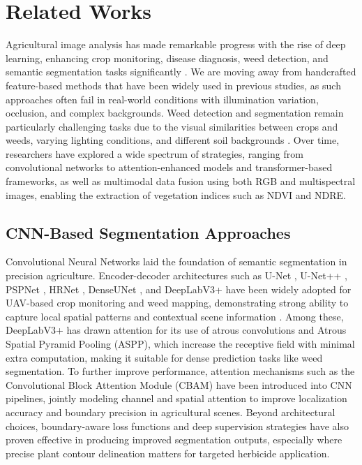 \documentclass[pdflatex,sn-mathphys-num]{sn-jnl}
\begin{document}
\section{Related Works}
Agricultural image analysis has made remarkable progress with the rise of deep learning, enhancing crop monitoring, disease diagnosis, weed detection, and semantic segmentation tasks significantly \cite{lei2024segmentationreview}. We are moving away from handcrafted feature-based methods that have been widely used in previous studies, as such approaches often fail in real-world conditions with illumination variation, occlusion, and complex backgrounds. Weed detection and segmentation remain particularly challenging tasks due to the visual similarities between crops and weeds, varying lighting conditions, and different soil backgrounds \cite{zhao2025deep,saini2025review}. Over time, researchers have explored a wide spectrum of strategies, ranging from convolutional networks to attention-enhanced models and transformer-based frameworks, as well as multimodal data fusion using both RGB and multispectral images, enabling the extraction of vegetation indices such as NDVI and NDRE.

\subsection{CNN-Based Segmentation Approaches}
Convolutional Neural Networks laid the foundation of semantic segmentation in precision agriculture. Encoder-decoder architectures such as U-Net \cite{ronneberger2015unet}, U-Net++ \cite{zhou2018unet++}, PSPNet \cite{zhao2017pyramid}, HRNet \cite{sun2019high}, DenseUNet \cite{safarov2021denseunet}, and DeepLabV3+ \cite{chen2018Deeplabv3plus} have been widely adopted for UAV-based crop monitoring and weed mapping, demonstrating strong ability to capture local spatial patterns and contextual scene information \cite{silva2024deep}. Among these, DeepLabV3+ has drawn attention for its use of atrous convolutions and Atrous Spatial Pyramid Pooling (ASPP), which increase the receptive field with minimal extra computation, making it suitable for dense prediction tasks like weed segmentation\cite{chen2018Deeplabv3plus}. To further improve performance, attention mechanisms such as the Convolutional Block Attention Module (CBAM)\cite{woo2018cbam} have been introduced into CNN pipelines, jointly modeling channel and spatial attention to improve localization accuracy and boundary precision in agricultural scenes\cite{li2022attention_agriculture}. Beyond architectural choices, boundary-aware loss functions and deep supervision strategies have also proven effective in producing improved segmentation outputs, especially where precise plant contour delineation matters for targeted herbicide application. 
\end{document}

